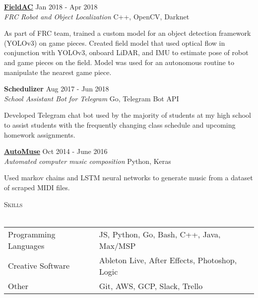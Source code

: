 \documentclass[a4paper]{article}
\newcommand{\lineunder} {
	\vspace*{-8pt} \\
	\hspace*{-18pt} \hrulefill \\
}
\newcommand{\header} [1] {
	{\hspace*{-18pt}\vspace*{6pt} \textsc{#1}}
	\vspace*{-6pt} \lineunder
}
\begin{document}
\noindent
\href{https://github.com/RoboticsTeam4904/FieldAC}{\textbf{FieldAC}} \hfill Jan 2018 - Apr 2018\\
\textit{FRC Robot and Object Localization} \hfill C++, OpenCV, Darknet\\
\vspace{-25pt}
\begin{paragraph}{}
As part of FRC team, trained a custom model for an object detection framework (YOLOv3) on game pieces. Created field model that used optical flow in conjunction with YOLOv3, onboard LiDAR, and IMU to estimate pose of robot and game pieces on the field. Model was used for an autonomous routine to manipulate the nearest game piece.\\
\end{paragraph}

\noindent
\textbf{Schedulizer} \hfill Aug 2017 - Jun 2018\\
\textit{School Assistant Bot for Telegram} \hfill Go, Telegram Bot API \\ 
\vspace{-25pt}
\begin{paragraph}{}
Developed Telegram chat bot used by the majority of students at my high school to assist students with the frequently changing class schedule and upcoming homework assignments. \\
\end{paragraph}

\noindent
\href{https://github.com/nacgarg/AutoMuse}{\textbf{AutoMuse}} \hfill Oct 2014 - June 2016\\
\textit{Automated computer music composition} \hfill Python, Keras \\
\vspace{-25pt}
\begin{paragraph}{}
Used markov chains and LSTM neural networks to generate music from a dataset of scraped MIDI files. \\ 

\end{paragraph}

\noindent
\header{Skills}
\noindent

\begin{tabular}{ l l }
	Programming Languages & JS, Python, Go, Bash, C++, Java, Max/MSP \\
	Creative Software             & Ableton Live, After Effects, Photoshop, Logic    \\
	Other                  & Git, AWS, GCP, Slack, Trello        \\
\end{tabular}
\vspace{8mm}
\noindent
\begin{center}
\end{center}
\end{document}
